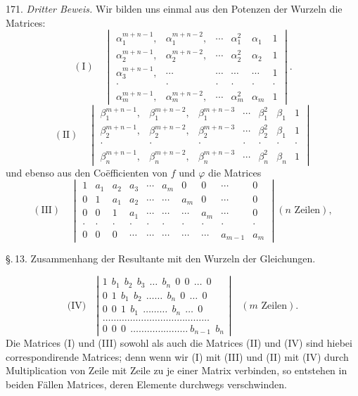 171. \textit{Dritter Beweis.} Wir bilden uns einmal aus den Potenzen der
Wurzeln die Matrices:
\[
(\mathrm{I}) \quad
\begin{vmatrix}
\alpha_1^{m+n-1}, & \alpha_1^{m+n-2}, & \cdots & \alpha_1^2 & \alpha_1 & 1 \\
\alpha_2^{m+n-1}, & \alpha_2^{m+n-2}, & \cdots & \alpha_2^2 & \alpha_2 & 1 \\
\alpha_3^{m+n-1}, & \cdots & \cdots & \cdots & \cdots & 1 \\
\cdot & \cdot & \cdot & \cdot & \cdot & \cdot \\
\alpha_m^{m+n-1}, & \alpha_m^{m+n-2}, & \cdots & \alpha_m^2 & \alpha_m & 1
\end{vmatrix}.
\]
\[
(\mathrm{II}) \quad
\begin{vmatrix}
\beta_1^{m+n-1}, & \beta_1^{m+n-2}, & \beta_1^{m+n-3} & \cdots & \beta_1^2 & \beta_1 & 1 \\
\beta_2^{m+n-1}, & \beta_2^{m+n-2}, & \beta_2^{m+n-3} & \cdots & \beta_2^2 & \beta_1 & 1 \\
\cdot & \cdot & \cdot & \cdot & \cdot & \cdot & \cdot \\
\beta_n^{m+n-1}, & \beta_n^{m+n-2}, & \beta_n^{m+n-3} & \cdots & \beta_n^2 & \beta_n & 1
\end{vmatrix}
\]
und ebenso aus den Coëfficienten von $f$ und $\varphi$ die Matrices
\[
(\mathrm{III}) \quad
\begin{vmatrix}
1 & a_1 & a_2 & a_3 & \cdots & a_m & 0 & 0 & \cdots & 0 \\
0 & 1 & a_1 & a_2 & \cdots & \cdots & a_m & 0 & \cdots & 0 \\
0 & 0 & 1 & a_1 & \cdots & \cdots & \cdots & a_m & \cdots & 0 \\
\cdot & \cdot & \cdot & \cdot & \cdot & \cdot & \cdot & \cdot & \cdot & \cdot \\
0 & 0 & 0 & \cdots & \cdots & \cdots & \cdots & \cdots & a_{m-1} & a_m
\end{vmatrix}
(n \text{ Zeilen}),
\]


\S.\,13. Zusammenhang der Resultante mit den Wurzeln der Gleichungen.

\[
\text{(IV)}\quad
\left|\begin{array}{l}
1\ \ b_1\ \ b_2\ \ b_3\ \ \ldots\ \ b_n\ \ 0\ \ 0\ \ \ldots\ \ 0\\
0\ \ 1\ \ b_1\ \ b_2\ \ \ldots\ldots\ \ b_n\ \ 0\ \ \ldots\ \ 0\\
0\ \ 0\ \ 1\ \ b_1\ \ \ldots\ldots\ldots\ \ b_n\ \ \ldots\ \ 0\\
\ldots\ldots\ldots\ldots\ldots\ldots\ldots\ldots\ldots\ldots\ldots\ldots\ldots\\
0\ \ 0\ \ 0\ \ \ldots\ldots\ldots\ldots\ldots\ldots\ldots\ b_{n-1}\ \ b_n
\end{array}\right|
\quad (m\text{ Zeilen}).
\]
Die Matrices (I) und (III) sowohl als auch die Matrices (II) und (IV)
sind hiebei correspondirende Matrices; denn wenn wir (I) mit (III)
und (II) mit (IV) durch Multiplication von Zeile mit Zeile zu je einer
Matrix verbinden, so entstehen in beiden Fällen Matrices, deren Elemente durchwegs verschwinden.

